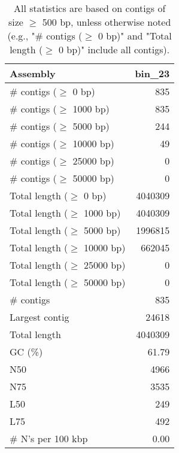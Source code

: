 \documentclass[12pt,a4paper]{article}
\begin{document}
\begin{table}[ht]
\begin{center}
\caption{All statistics are based on contigs of size $\geq$ 500 bp, unless otherwise noted (e.g., "\# contigs ($\geq$ 0 bp)" and "Total length ($\geq$ 0 bp)" include all contigs).}
\begin{tabular}{|l*{1}{|r}|}
\hline
Assembly & bin\_23 \\ \hline
\# contigs ($\geq$ 0 bp) & 835 \\ \hline
\# contigs ($\geq$ 1000 bp) & 835 \\ \hline
\# contigs ($\geq$ 5000 bp) & 244 \\ \hline
\# contigs ($\geq$ 10000 bp) & 49 \\ \hline
\# contigs ($\geq$ 25000 bp) & 0 \\ \hline
\# contigs ($\geq$ 50000 bp) & 0 \\ \hline
Total length ($\geq$ 0 bp) & 4040309 \\ \hline
Total length ($\geq$ 1000 bp) & 4040309 \\ \hline
Total length ($\geq$ 5000 bp) & 1996815 \\ \hline
Total length ($\geq$ 10000 bp) & 662045 \\ \hline
Total length ($\geq$ 25000 bp) & 0 \\ \hline
Total length ($\geq$ 50000 bp) & 0 \\ \hline
\# contigs & 835 \\ \hline
Largest contig & 24618 \\ \hline
Total length & 4040309 \\ \hline
GC (\%) & 61.79 \\ \hline
N50 & 4966 \\ \hline
N75 & 3535 \\ \hline
L50 & 249 \\ \hline
L75 & 492 \\ \hline
\# N's per 100 kbp & 0.00 \\ \hline
\end{tabular}
\end{center}
\end{table}
\end{document}
